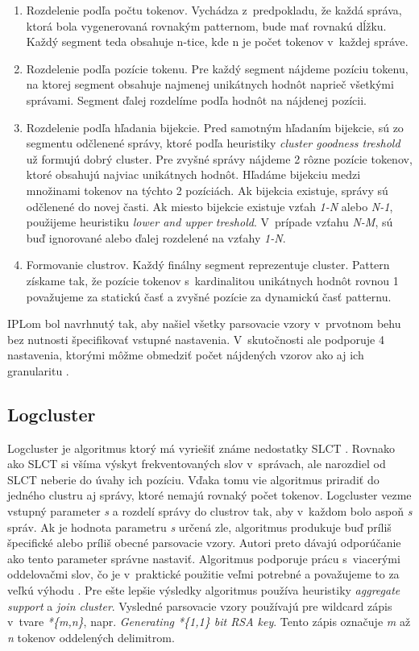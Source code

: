 \begin{enumerate}
  \item Rozdelenie podľa počtu tokenov. Vychádza z~predpokladu, že každá správa, ktorá bola vygenerovaná rovnakým patternom, bude mať rovnakú dĺžku. Každý segment teda obsahuje n-tice, kde n je počet tokenov v~každej správe.
  \item Rozdelenie podľa pozície tokenu. Pre každý segment nájdeme pozíciu tokenu, na ktorej segment obsahuje najmenej unikátnych hodnôt naprieč všetkými správami. Segment ďalej rozdelíme podľa hodnôt na nájdenej pozícii.
  \item Rozdelenie podľa hľadania bijekcie. Pred samotným hľadaním bijekcie, sú zo segmentu odčlenené správy, ktoré podľa heuristiky \emph{cluster goodness treshold} už formujú dobrý cluster. Pre zvyšné správy nájdeme 2 rôzne pozície tokenov, ktoré obsahujú najviac unikátnych hodnôt. Hľadáme bijekciu medzi množinami tokenov na týchto 2 pozíciách. Ak bijekcia existuje, správy sú odčlenené do novej časti. Ak miesto bijekcie existuje vzťah \emph{1-N} alebo \emph{N-1}, použijeme heuristiku \emph{lower and upper treshold}. V~prípade vzťahu \emph{N-M}, sú buď ignorované alebo ďalej rozdelené na vzťahy \emph{1-N}.
  \item Formovanie clustrov. Každý finálny segment reprezentuje cluster. Pattern získame tak, že pozície tokenov s~kardinalitou unikátnych hodnôt rovnou 1 považujeme za statickú časť a zvyšné pozície za dynamickú časť patternu.
\end{enumerate}

IPLom bol navrhnutý tak, aby našiel všetky parsovacie vzory v~prvotnom behu bez nutnosti špecifikovať vstupné nastavenia. V~skutočnosti ale podporuje 4 nastavenia, ktorými môžme obmedziť počet nájdených vzorov ako aj ich granularitu \parencite{nagappanvouk}.

\subsection{Logcluster}

Logcluster je algoritmus ktorý má vyriešiť známe nedostatky SLCT \parencite{logcluster}. Rovnako ako SLCT si všíma výskyt frekventovaných slov v~správach, ale narozdiel od SLCT neberie do úvahy ich pozíciu. Vďaka tomu vie algoritmus priradiť do jedného clustru aj správy, ktoré nemajú rovnaký počet tokenov. Logcluster vezme vstupný parameter \emph{s}  a rozdelí správy do clustrov tak, aby v~každom bolo aspoň \emph{s} správ. Ak je hodnota parametru \emph{s} určená zle, algoritmus produkuje buď príliš špecifické alebo príliš obecné parsovacie vzory. Autori preto dávajú odporúčanie ako tento parameter správne nastaviť. Algoritmus podporuje prácu s~viacerými oddelovačmi slov, čo je v~praktické použitie veľmi potrebné a považujeme to za veľkú výhodu \parencite{logclustertool}. Pre ešte lepšie výsledky algoritmus používa heuristiky \emph{aggregate \, support} a \emph{join cluster}. Vysledné parsovacie vzory používajú pre wildcard zápis v~tvare \emph{*\{m,n\}}, napr. \emph{Generating *\{1,1\} bit RSA key}. Tento zápis označuje \emph{m} až \emph{n} tokenov oddelených delimitrom.


